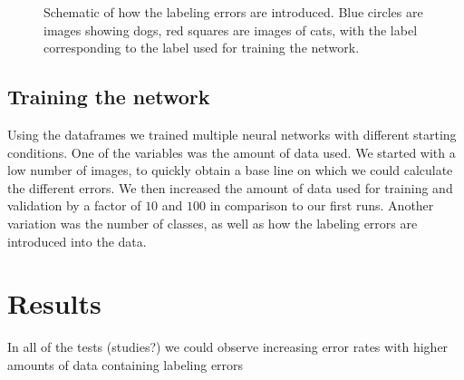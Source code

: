 \documentclass[a4paper,11pt]{scrartcl}
\theoremstyle{definition}
\begin{document}
\begin{figure}[h!]
\begin{subfigure}[t]{0.32\textwidth}
\vspace{5mm}
		\label{img:schematic_symmetrical}
	\end{subfigure}
	\caption[Labeling schematic]{Schematic of how the labeling errors are introduced. Blue circles are images showing dogs, red squares are images of cats, with the label corresponding to the label used for training the network.}
	\label{img:schematics}
\end{figure}
\subsection{Training the network}
Using the dataframes we trained multiple neural networks with different starting conditions. One of the variables was the amount of data used. We started with a low number of images, to quickly obtain a base line on which we could calculate the different errors. We then increased the amount of data used for training and validation by a factor of $10$ and $100$ in comparison to our first runs. Another variation was the number of classes, as well as how the labeling errors are introduced into the data.


\section{Results}
In all of the tests (studies?) we could observe increasing error rates with higher amounts of data containing labeling errors
\end{document}
